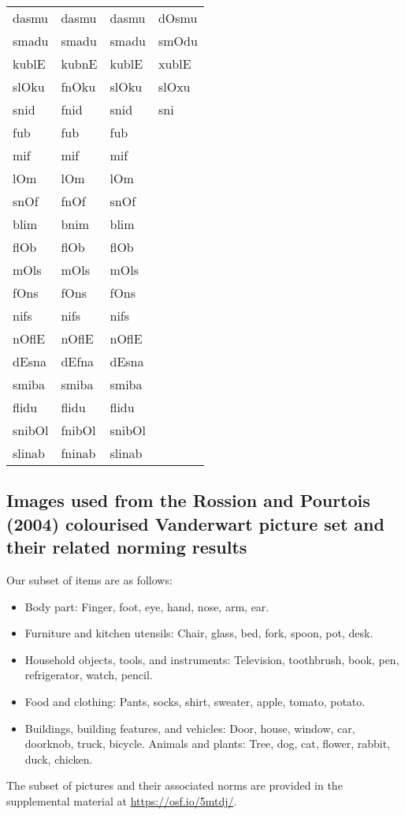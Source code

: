 \documentclass[doc,floatsintext]{apa6}
\begin{document}
\begin{appendix}
\begin{table}[!h]
\begin{tabular}{llll}
dasmu & dasmu & dasmu & dOsmu\\
smadu & smadu & smadu & smOdu\\
kublE & kubnE & kublE & xublE\\
slOku & fnOku & slOku & slOxu\\
snid & fnid & snid & sni\\
fub & fub & fub & \\
mif & mif & mif & \\
lOm & lOm & lOm & \\
snOf & fnOf & snOf & \\
blim & bnim & blim & \\
flOb & flOb & flOb & \\
mOls & mOls & mOls & \\
fOns & fOns & fOns & \\
nifs & nifs & nifs & \\
nOflE & nOflE & nOflE & \\
dEsna & dEfna & dEsna & \\
smiba & smiba & smiba & \\
flidu & flidu & flidu & \\
snibOl & fnibOl & snibOl & \\
slinab & fninab & slinab & \\
\bottomrule
\end{tabular}
\end{table}
\end{appendix}

\clearpage



\begin{appendix}
\section{}
\subsection{Images used from the Rossion and Pourtois (2004) colourised
Vanderwart picture set and their related norming
results}\label{appendix-d}

Our subset of items are as follows:

\begin{itemize}
\item
  Body part: Finger, foot, eye, hand, nose, arm, ear.
\item
  Furniture and kitchen utensils: Chair, glass, bed, fork, spoon, pot,
  desk.
\item
  Household objects, tools, and instruments: Television, toothbrush,
  book, pen, refrigerator, watch, pencil.
\item
  Food and clothing: Pants, socks, shirt, sweater, apple, tomato,
  potato.
\item
  Buildings, building features, and vehicles: Door, house, window, car,
  doorknob, truck, bicycle. Animals and plants: Tree, dog, cat, flower,
  rabbit, duck, chicken.
\end{itemize}

The subset of pictures and their associated norms are provided in the
supplemental material at \url{https://osf.io/5mtdj/}.
\end{appendix}
\end{document}
